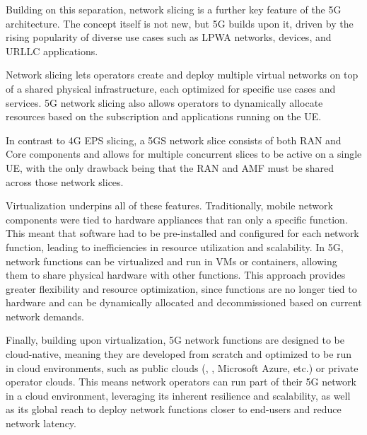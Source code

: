 \label{sec:network_slicing}
Building on this separation, network slicing is a further key feature of the 5G architecture. The concept itself is not new, but 5G builds upon it, driven by the rising popularity of diverse use cases such as \gls{LPWA} networks,  devices, and \gls{URLLC} applications.

Network slicing lets operators create and deploy multiple virtual networks on top of a shared physical infrastructure, each optimized for specific use cases and services. 5G network slicing also allows operators to dynamically allocate resources based on the subscription and applications running on the \gls{UE}.

In contrast to 4G \gls{EPS} slicing, a 5GS network slice consists of both \gls{RAN} and Core components and allows for multiple concurrent slices to be active on a single \gls{UE}, with the only drawback being that the \gls{RAN} and \gls{AMF} must be shared across those network slices.

\label{sec:virtualization}

Virtualization underpins all of these features. Traditionally, mobile network components were tied to hardware appliances that ran only a specific function. This meant that software had to be pre-installed and configured for each network function, leading to inefficiencies in resource utilization and scalability. In 5G, network functions can be virtualized and run in \glspl{VM} or containers, allowing them to share physical hardware with other functions. This approach provides greater flexibility and resource optimization, since functions are no longer tied to hardware and can be dynamically allocated and decommissioned based on current network demands.

\label{sec:cloud-native_functions}
Finally, building upon virtualization, 5G network functions are designed to be cloud-native, meaning they are developed from scratch and optimized to be run in cloud environments, such as public clouds (, , Microsoft Azure, etc.) or private operator clouds. This means network operators can run part of their 5G network in a cloud environment, leveraging its inherent resilience and scalability, as well as its global reach to deploy network functions closer to end-users and reduce network latency.

